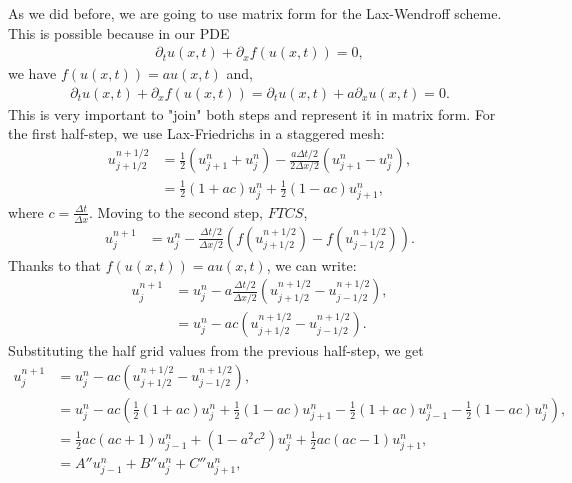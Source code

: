 \begin{questions}
\begin{solution}
As we did before, we are going to use matrix form for the Lax-Wendroff scheme. This is possible because in our PDE
\begin{align*}
\partial_tu(x,t)+\partial_xf(u(x,t)) = 0,
\end{align*}
we have $f(u(x,t)) = au(x,t)$ and,
\begin{align*}
\partial_tu(x,t)+\partial_xf(u(x,t)) = \partial_tu(x,t)+a\partial_xu(x,t) = 0.
\end{align*}
This is very important to "join" both steps and represent it in matrix form. For the first half-step, we use Lax-Friedrichs in a staggered mesh:
\begin{align*}
u_{j+1/2}^{n+1/2} &= \frac{1}{2}\left(u_{j+1}^n+u_{j}^n\right)-\frac{a\Delta t/2}{2\Delta x/2}\left(u_{j+1}^n-u_{j}^n\right),\\
 &= \frac{1}{2}\left(1+ac\right)u_{j}^n + \frac{1}{2}\left(1-ac\right)u_{j+1}^n,
\end{align*}
where $c = \frac{\Delta t}{\Delta x}$. Moving to the second step, $FTCS$,
\begin{align*}
u_{j}^{n+1} &= u_{j}^{n}-\frac{\Delta t/2}{\Delta x/2}\left(f\left(u_{j+1/2}^{n+1/2}\right)-f\left(u_{j-1/2}^{n+1/2}\right)\right).
\end{align*}
Thanks to that $f(u(x,t)) = au(x,t)$, we can write:
\begin{align*}
u_{j}^{n+1} &= u_{j}^{n}-a\frac{\Delta t/2}{\Delta x/2}\left(u_{j+1/2}^{n+1/2}-u_{j-1/2}^{n+1/2}\right),\\
&= u_{j}^{n}-ac\left(u_{j+1/2}^{n+1/2}-u_{j-1/2}^{n+1/2}\right).
\end{align*}
Substituting the half grid values from the previous half-step, we get
\begin{align*}
u_{j}^{n+1} &= u_{j}^{n}-ac\left(u_{j+1/2}^{n+1/2}-u_{j-1/2}^{n+1/2}\right),\\
&= u_{j}^{n}-ac\left(\frac{1}{2}\left(1+ac\right)u_{j}^n + \frac{1}{2}\left(1-ac\right)u_{j+1}^n-\frac{1}{2}\left(1+ac\right)u_{j-1}^n - \frac{1}{2}\left(1-ac\right)u_{j}^n\right),\\
&= \frac{1}{2}ac\left(ac+1\right)u_{j-1}^n+\left(1-a^2c^2\right)u_{j}^n+\frac{1}{2}ac\left(ac-1\right)u_{j+1}^n,\\
&= A''u_{j-1}^n+B''u_{j}^n+C''u_{j+1}^n,\\
\end{align*}

\end{solution}
\end{questions}
